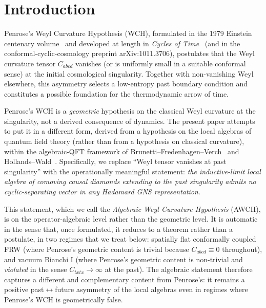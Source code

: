 \documentclass[11pt]{article}
\theoremstyle{definition}
\begin{document}
\begin{abstract}
extensions to non-conformal couplings, matter content beyond the strong-energy-condition asymptotic Kasner regime, and full quantum gravity beyond AQFT in fixed backgrounds are discussed.
\end{abstract}

\section{Introduction}\label{sec:intro}

Penrose's Weyl Curvature Hypothesis (WCH), formulated in the 1979 Einstein centenary volume~\cite{Penrose1979} and developed at length in \emph{Cycles of Time}~\cite{Penrose2010} (and in the conformal-cyclic-cosmology preprint arXiv:1011.3706), postulates that the Weyl curvature tensor $C_{abcd}$ vanishes (or is uniformly small in a suitable conformal sense) at the initial cosmological singularity. Together with non-vanishing Weyl elsewhere, this asymmetry selects a low-entropy past boundary condition and constitutes a possible foundation for the thermodynamic arrow of time.

Penrose's WCH is a \emph{geometric} hypothesis on the classical Weyl curvature at the singularity, not a derived consequence of dynamics. The present paper attempts to put it in a different form, derived from a hypothesis on the local algebras of quantum field theory (rather than from a hypothesis on classical curvature), within the algebraic-QFT framework of Brunetti--Fredenhagen--Verch~\cite{BrunettiFredenhagenVerch2003} and Hollands--Wald~\cite{HollandsWald2001}. Specifically, we replace ``Weyl tensor vanishes at past singularity'' with the operationally meaningful statement: \emph{the inductive-limit local algebra of comoving causal diamonds extending to the past singularity admits no cyclic-separating vector in any Hadamard GNS representation}.

This statement, which we call the \emph{Algebraic Weyl Curvature Hypothesis} (AWCH), is on the operator-algebraic level rather than the geometric level. It is automatic in the sense that, once formulated, it reduces to a theorem rather than a postulate, in two regimes that we treat below: spatially flat conformally coupled FRW (where Penrose's geometric content is trivial because $C_{abcd}\equiv 0$ throughout), and vacuum Bianchi I (where Penrose's geometric content is non-trivial and \emph{violated} in the sense $C_{txtx}\to\infty$ at the past). The algebraic statement therefore captures a different and complementary content from Penrose's: it remains a positive past$\leftrightarrow$future asymmetry of the local algebras even in regimes where Penrose's WCH is geometrically false.
\end{document}

